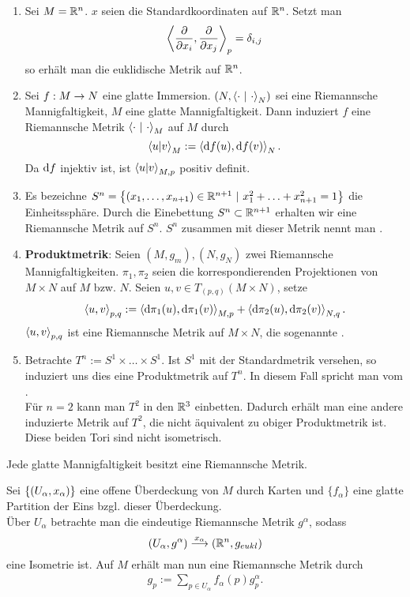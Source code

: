 \begin{enumerate}[(1)]
	\item \Bsp{} Sei $M = \mathbb{R}^n$. $x$ seien die Standardkoordinaten auf $\mathbb{R}^n$. Setzt man
	\[ \left<\frac{\partial }{\partial x_i}, \frac{\partial }{\partial x_j}\right>_p = \delta_{i,j} \]
	so erhält man die euklidische Metrik auf $\mathbb{R}^n$.
	\item Sei $f:M\overset{}{\rightarrow} N$ eine glatte Immersion. $(N,\left<\cdot~|~\cdot\right>_N)$ sei eine Riemannsche Mannigfaltigkeit, $M$ eine glatte Mannigfaltigkeit. Dann induziert $f$ eine Riemannsche Metrik $\left<\cdot ~|~\cdot\right>_M$ auf $M$ durch
	\[ \left<u|v\right>_M:= \left<\text{d} f(u), \text{d} f(v)\right>_N. \]
	Da $\text{d} f$ injektiv ist, ist $ \left<u|v\right>_{M,p}$ positiv definit.
	\item \Bsp{} Es bezeichne $S^n = \set{(x_1,\ldots,x_{n+1}) \in \R^{n+1}}{x_1^2 + \ldots + x_{n+1}^2 = 1}$ die Einheitssphäre. Durch die Einebettung $S^n \subset \mathbb{R}^{n+1}$ erhalten wir eine Riemannsche Metrik auf $S^n$. $S^n$ zusammen mit dieser Metrik nennt man .
	\item \textbf{Produktmetrik}: Seien $(M, g_m), (N,g_N)$ zwei Riemannsche Mannigfaltigkeiten. $\pi_1, \pi_2$ seien die korrespondierenden Projektionen von $M\times N$ auf $M$ bzw. $N$. Seien $u,v \in T_{(p,q)}(M\times N)$, setze
	\begin{align*}
	\left<u,v\right>_{p,q} := \left<\text{d} \pi_1(u), \text{d} \pi_1(v)\right>_{M,p} + \left<\text{d} \pi_2(u), \text{d} \pi_2(v)\right>_{N,q}. 
	\end{align*}
	$\left<u,v\right>_{p,q}$ ist eine Riemannsche Metrik auf $M \times N$, die sogenannte .
	\item \Bsp{} Betrachte $T^n := S^1 \times \ldots \times S^1$. Ist $S^1$ mit der Standardmetrik versehen, so induziert uns dies eine Produktmetrik auf $T^n$. In diesem Fall spricht man vom .\\
	Für $n=2$ kann man $T^2$ in den $\mathbb{R}^3$ einbetten. Dadurch erhält man eine andere induzierte Metrik auf $T^2$, die nicht äquivalent zu obiger Produktmetrik ist. Diese beiden Tori sind nicht isometrisch.
\end{enumerate}

\Prop{}
Jede glatte Mannigfaltigkeit besitzt eine Riemannsche Metrik.

\begin{Beweis}{}
Sei $\set{(U_\alpha,x_\alpha)}{}$ eine offene Überdeckung von $M$ durch Karten und $\{f_\alpha\}$ eine glatte Partition der Eins bzgl. dieser Überdeckung.\\
Über $U_\alpha$ betrachte man die eindeutige Riemannsche Metrik $g^\alpha$, sodass
\[ (U_\alpha,g^\alpha) \overset{x_\alpha}{\longrightarrow} (\mathbb{R}^n, g_{eukl}) \]
eine Isometrie ist. Auf $M$ erhält man nun eine Riemannsche Metrik durch
\begin{align*}
g_p := \sum_{p\in U_\alpha} f_\alpha(p) g_p^\alpha.
\end{align*}
\end{Beweis}

